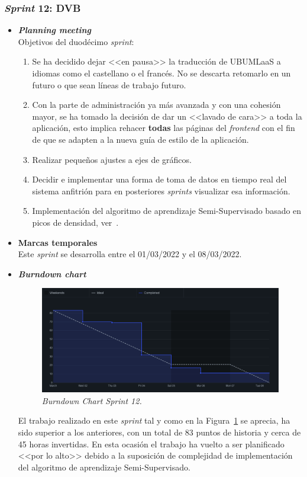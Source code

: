 \subsubsection{\textit{Sprint} 12: DVB}
\begin{itemize}
\item \textbf{\textit{Planning meeting}}\\
Objetivos del duodécimo \textit{sprint}:
\begin{enumerate}
\item Se ha decidido dejar <<en pausa>> la traducción de UBUMLaaS a idiomas como el castellano o el francés. No se descarta retomarlo en un futuro o que sean líneas de trabajo futuro.
\item Con la parte de administración ya más avanzada y con una cohesión mayor, se ha tomado la decisión de dar un <<lavado de cara>> a toda la aplicación, esto implica rehacer \textbf{todas} las páginas del \textit{frontend} con el fin de que se adapten a la nueva guía de estilo de la aplicación.
\item Realizar pequeños ajustes a ejes de gráficos.
\item Decidir e implementar una forma de toma de datos en tiempo real del sistema anfitrión para en posteriores \textit{sprints} visualizar esa información.
\item Implementación del algoritmo de aprendizaje Semi-Supervisado basado en picos de densidad, ver~\cite{WU2018180}.
\end{enumerate}

\item \textbf{Marcas temporales}\\
Este \textit{sprint} se desarrolla entre el 01/03/2022 y el 08/03/2022.

\item \textbf{\textit{Burndown chart}}\\
\begin{figure}
\begin{center}
\includegraphics[width=\textwidth]{../img/anexos/sprints/BD-Sprint12}
\caption{\textit{Burndown Chart Sprint 12.}}\label{fig:BD-Sprint12}
\end{center}
\end{figure}
El trabajo realizado en este \textit{sprint} tal y como en la Figura~\ref{fig:BD-Sprint12} se aprecia, ha sido superior a los anteriores, con un total de 83 puntos de historia y cerca de 45 horas invertidas. En esta ocasión el trabajo ha vuelto a ser planificado <<por lo alto>> debido a la suposición de complejidad de implementación del algoritmo de aprendizaje Semi-Supervisado. 


\end{itemize}
